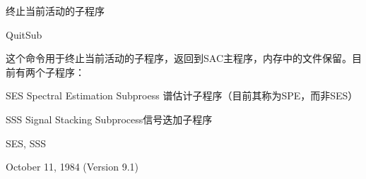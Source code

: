 \label{cmd:quitsub}

终止当前活动的子程序

QuitSub

这个命令用于终止当前活动的子程序，返回到SAC主程序，内存中的文件保留。目前有两个子程序：

SES Spectral Estimation Subproess 谱估计子程序（目前其称为SPE，而非SES）

SSS Signal Stacking Subprocess信号迭加子程序

SES, SSS

October 11, 1984 (Version 9.1)
